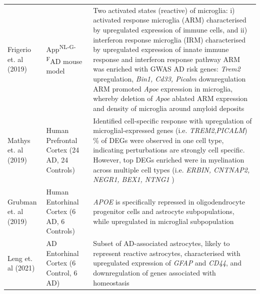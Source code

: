 \begin{landscape}
\begin{longtable}[c]{p{4cm}p{4cm}p{18cm}}
		\centering Frigerio et. al (2019)\cite{Frigerio2019} &
		\centering App\textsuperscript{NL-G-F}\newline AD mouse model  &
		\tabitem Two activated states (reactive) of microglia: i) activated response microglia (ARM) characterised by upregulated expression of immune cells, and ii) interferon response microglia (IRM) characterised by upregulated expression of innate immune response and interferon response pathway  \newline
		\tabitem ARM was enriched with GWAS AD risk genes: \textit{Trem2} upregulation, \textit{Bin1, Cd33, Picalm} downregulation  \newline
		\tabitem ARM promoted \textit{Apoe} expression in microglia, whereby deletion of \textit{Apoe} ablated ARM expression and density of microglia around amyloid deposits \\
		\hdashline[0.5pt/5pt]
		
		\centering Mathys et. al (2019)\cite{Mathys2019} &
		\centering Human Prefrontal Cortex (24 AD, 24 Controls)  &
		\tabitem Identified cell-specific response with upregulation of microglial-expressed genes (i.e. \textit{TREM2},\textit{PICALM}) \newline
		\tabitem 95\% of DEGs were observed in one cell type, indicating perturbations are strongly cell specific.  However, top DEGs enriched were in myelination across multiple cell types (i.e. \textit{ERBIN, CNTNAP2, NEGR1, BEX1, NTNG1} )   \\
		\hdashline[0.5pt/5pt]
		
		\centering Grubman et. al (2019)\cite{Grubman2019} &
		\centering Human Entorhinal Cortex (6 AD, 6 Controls)  &
		\tabitem \textit{APOE} is specifically repressed in oligodendrocyte progenitor cells and astrocyte subpopulations, while upregulated in microglial subpopulation  \\
		\hdashline[0.5pt/5pt]
		
		\centering Leng et. al (2021)\cite{Leng2021} &
		\centering AD Entorhinal Cortex (6 Control, 6 AD)  &
		\tabitem Subset of AD-associated astrocytes, likely to represent reactive astrocytes, characterised with upregulated expression of \textit{GFAP} and \textit{CD44}, and downregulation of genes associated with homeostasis  		
		\\* \bottomrule
	\end{longtable}
\end{landscape}
\restoregeometry


\newpage
